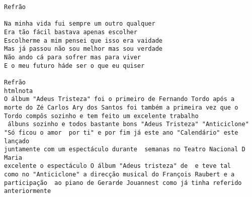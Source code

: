\documentclass{article}
\begin{document}
\begin{verbatim}
Refrão

Na minha vida fui sempre um outro qualquer
Era tão fácil bastava apenas escolher
Escolherme a mim pensei que isso era vaidade
Mas já passou não sou melhor mas sou verdade
Não ando cá para sofrer mas para viver
E o meu futuro háde ser o que eu quiser

Refrão
htmlnota
O álbum "Adeus Tristeza" foi o primeiro de Fernando Tordo após a
morte do Zé Carlos Ary dos Santos foi também a primeira vez que o 
Tordo compôs sozinho e tem feito um excelente trabalho 
 álbuns sozinho e todos bastante bons "Adeus Tristeza" "Anticiclone" 
"Só ficou o amor  por ti" e por fim já este ano "Calendário" este lançado
juntamente com um espectáculo durante  semanas no Teatro Nacional D Maria 
excelente o espectáculo O álbum "Adeus tristeza" de  e teve tal 
como no "Anticiclone" a direcção musical do François Raubert e a
participação  ao piano de Gerarde Jouannest como já tinha referido
anteriormente

\end{verbatim}
\end{document}
